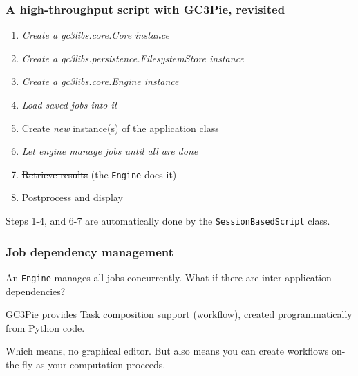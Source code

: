 \documentclass[english,serif,mathserif,xcolor=pdftex,dvipsnames,table]{beamer}
\begin{document}
\begin{frame}
  \frametitle{A high-throughput script with GC3Pie, revisited}
  
  \begin{enumerate}
  \item \emph{Create a gc3libs.core.Core instance}
  \item \emph{Create a gc3libs.persistence.FilesystemStore instance}
  \item \emph{Create a gc3libs.core.Engine instance}
  \item \emph{Load saved jobs into it}
  \item Create \emph{new} instance(s) of the application class
  \item \emph{Let engine manage jobs until all are done}
  \item \sout{Retrieve results} (the \texttt{Engine} does it)
  \item Postprocess and display
  \end{enumerate}
  
  Steps 1-4, and 6-7 are automatically done by the
  \texttt{SessionBasedScript} class.
\end{frame}

\begin{frame}
\frametitle{Job dependency management}
  \begin{block}{}
  An \texttt{Engine} manages all jobs concurrently.
  What if there are inter-application dependencies?
  \end{block}

  \begin{block}{}
  GC3Pie provides {\color{Blue}Task composition} support (workflow), created
  programmatically from Python code.
  \end{block}

  \begin{block}{}
  Which means, no graphical editor.  But also means you can create
  workflows {\color{Blue}on-the-fly} as your computation proceeds.
  \end{block}
\end{frame}
\end{document}
